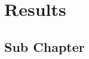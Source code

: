\chapter{Results}
	\label{sec: Chapter 4}
	\lipsum[4]
	
	\section{Sub Chapter}
		\label{sec: sub chapter in chapter 4}
		\lipsum[5]


